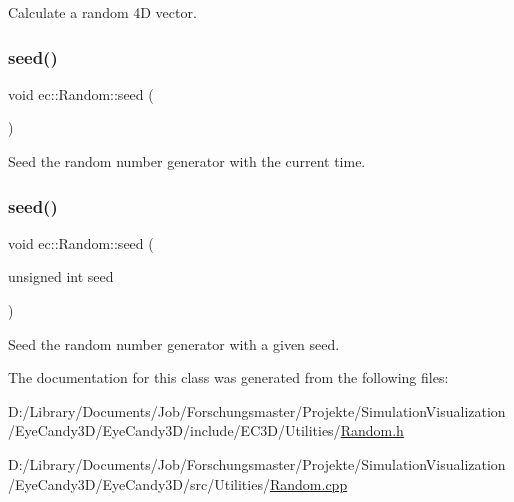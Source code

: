 Calculate a random 4D vector. \mbox{\label{classec_1_1_random_a3e4ad02afb2979b3549fbd70e6f71412}} 
\subsubsection{\texorpdfstring{seed()}{seed()}\hspace{0.1cm}{\footnotesize\ttfamily [1/2]}}
{\footnotesize\ttfamily void ec\+::\+Random\+::seed (\begin{DoxyParamCaption}{ }\end{DoxyParamCaption})\hspace{0.3cm}{\ttfamily [static]}}

Seed the random number generator with the current time. \mbox{\label{classec_1_1_random_aa2b21cb97b3a7c36e89b8afda6ca500d}} 
\subsubsection{\texorpdfstring{seed()}{seed()}\hspace{0.1cm}{\footnotesize\ttfamily [2/2]}}
{\footnotesize\ttfamily void ec\+::\+Random\+::seed (\begin{DoxyParamCaption}\item[{unsigned int}]{seed }\end{DoxyParamCaption})\hspace{0.3cm}{\ttfamily [static]}}

Seed the random number generator with a given seed. 

The documentation for this class was generated from the following files\+:\begin{DoxyCompactItemize}
\item 
D\+:/\+Library/\+Documents/\+Job/\+Forschungsmaster/\+Projekte/\+Simulation\+Visualization/\+Eye\+Candy3\+D/\+Eye\+Candy3\+D/include/\+E\+C3\+D/\+Utilities/\mbox{\hyperlink{_random_8h}{Random.\+h}}\item 
D\+:/\+Library/\+Documents/\+Job/\+Forschungsmaster/\+Projekte/\+Simulation\+Visualization/\+Eye\+Candy3\+D/\+Eye\+Candy3\+D/src/\+Utilities/\mbox{\hyperlink{_random_8cpp}{Random.\+cpp}}\end{DoxyCompactItemize}
